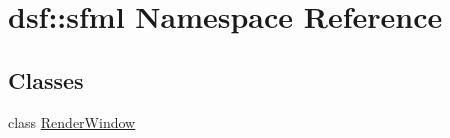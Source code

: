 \hypertarget{namespacedsf_1_1sfml}{}\section{dsf\+:\+:sfml Namespace Reference}
\label{namespacedsf_1_1sfml}
\subsection*{Classes}
\begin{DoxyCompactItemize}
\item 
class \hyperlink{classdsf_1_1sfml_1_1_render_window}{Render\+Window}
\end{DoxyCompactItemize}
